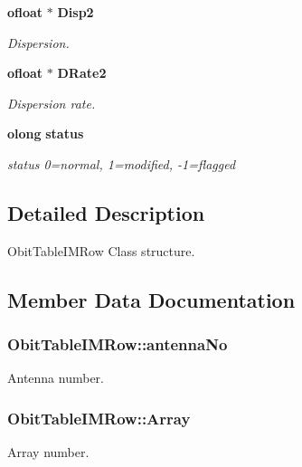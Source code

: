 \begin{CompactItemize}
{\bf ofloat} $\ast$ {\bf Disp2}
\begin{CompactList}\small\item\em Dispersion. \item\end{CompactList}\item 
{\bf ofloat} $\ast$ {\bf DRate2}
\begin{CompactList}\small\item\em Dispersion rate. \item\end{CompactList}\item 
{\bf olong} {\bf status}
\begin{CompactList}\small\item\em status 0=normal, 1=modified, -1=flagged \item\end{CompactList}\end{CompactItemize}


\subsection{Detailed Description}
Obit\-Table\-IMRow Class structure. 



\subsection{Member Data Documentation}
\subsubsection{ {\bf Obit\-Table\-IMRow::antenna\-No}}\label{structObitTableIMRow_o9}


Antenna number. 

\subsubsection{ {\bf Obit\-Table\-IMRow::Array}}\label{structObitTableIMRow_o10}


Array number. 

